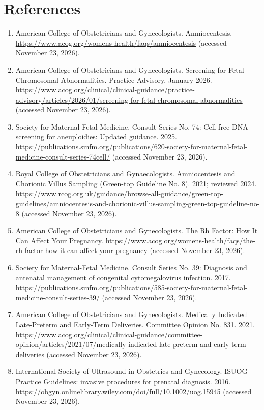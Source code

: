 \section*{References}
\begin{enumerate}
  \item American College of Obstetricians and Gynecologists. Amniocentesis. \url{https://www.acog.org/womens-health/faqs/amniocentesis} (accessed November 23, 2026).
  \item American College of Obstetricians and Gynecologists. Screening for Fetal Chromosomal Abnormalities. Practice Advisory, January 2026. \url{https://www.acog.org/clinical/clinical-guidance/practice-advisory/articles/2026/01/screening-for-fetal-chromosomal-abnormalities} (accessed November 23, 2026).
  \item Society for Maternal-Fetal Medicine. Consult Series No. 74: Cell-free DNA screening for aneuploidies: Updated guidance. 2025. \url{https://publications.smfm.org/publications/620-society-for-maternal-fetal-medicine-consult-series-74cell/} (accessed November 23, 2026).
  \item Royal College of Obstetricians and Gynaecologists. Amniocentesis and Chorionic Villus Sampling (Green-top Guideline No. 8). 2021; reviewed 2024. \url{https://www.rcog.org.uk/guidance/browse-all-guidance/green-top-guidelines/amniocentesis-and-chorionic-villus-sampling-green-top-guideline-no-8} (accessed November 23, 2026).
  \item American College of Obstetricians and Gynecologists. The Rh Factor: How It Can Affect Your Pregnancy. \url{https://www.acog.org/womens-health/faqs/the-rh-factor-how-it-can-affect-your-pregnancy} (accessed November 23, 2026).
  \item Society for Maternal-Fetal Medicine. Consult Series No. 39: Diagnosis and antenatal management of congenital cytomegalovirus infection. 2017. \url{https://publications.smfm.org/publications/585-society-for-maternal-fetal-medicine-consult-series-39/} (accessed November 23, 2026).
  \item American College of Obstetricians and Gynecologists. Medically Indicated Late-Preterm and Early-Term Deliveries. Committee Opinion No. 831. 2021. \url{https://www.acog.org/clinical/clinical-guidance/committee-opinion/articles/2021/07/medically-indicated-late-preterm-and-early-term-deliveries} (accessed November 23, 2026).
  \item International Society of Ultrasound in Obstetrics and Gynecology. ISUOG Practice Guidelines: invasive procedures for prenatal diagnosis. 2016. \url{https://obgyn.onlinelibrary.wiley.com/doi/full/10.1002/uog.15945} (accessed November 23, 2026).
\end{enumerate}

\clearpage
